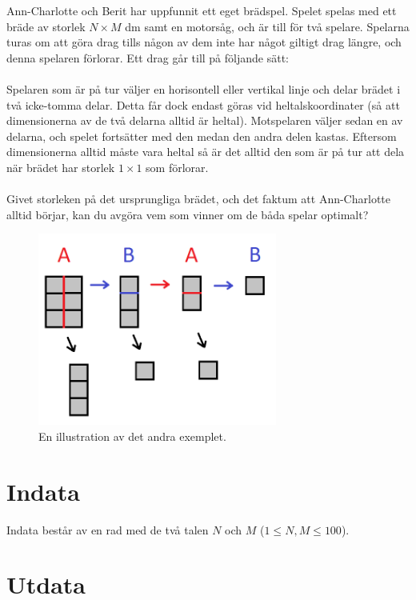 
Ann-Charlotte och Berit har uppfunnit ett eget brädspel. Spelet spelas med ett
bräde av storlek $N \times M$ dm samt en motorsåg, och är till för två spelare.
Spelarna turas om att göra drag tills någon av dem inte har något giltigt drag
längre, och denna spelaren förlorar. Ett drag går till på följande sätt:
\\\\
Spelaren som är på tur väljer en horisontell eller vertikal linje och delar
brädet i två icke-tomma delar. Detta får dock endast göras vid heltalskoordinater (så att
dimensionerna av de två delarna alltid är heltal). Motspelaren väljer sedan en av
delarna, och spelet fortsätter med den medan den andra delen kastas. Eftersom
dimensionerna alltid måste vara heltal så är det alltid den som är på tur att
dela när brädet har storlek $1 \times 1$ som förlorar.
\\\\
Givet storleken på det ursprungliga brädet, och det faktum att Ann-Charlotte
alltid börjar, kan du avgöra vem som vinner om de båda spelar optimalt?

\begin{figure}[ht!]
\centering
\includegraphics[width=0.7\textwidth]{bradspelet.png}
\caption{En illustration av det andra exemplet.}
\label{overflow}
\end{figure}

\section*{Indata}
Indata består av en rad med de två talen $N$ och $M$ ($1 \le N,M \le 100$).

\section*{Utdata}

